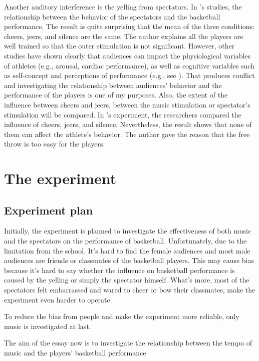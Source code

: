 \documentclass[man,floatsintext]{apa7}
\begin{document}
Another auditory interference is the yelling from spectators. In \textcite{eptingCheersVsJeers}'s studies, the relationship between the behavior of the spectators and the basketball performance. The result is quite surprising that the mean of the three conditions: cheers, jeers, and silence are the same. The author explains all the players are well trained so that the outer stimulation is not significant. However, other studies have shown clearly that audiences can impact the physiological variables of athletes (e.g., arousal, cardiac performance), as well as cognitive variables such as self-concept and perceptions of performance  (e.g., see \textcite{jonesAllWorldStage2007}). That produces conflict and investigating the relationship between audiences' behavior and the performance of the players is one of my purposes. Also, the extent of the influence between cheers and jeers, between the music stimulation or spectator's stimulation will be compared. In \textcite{eptingCheersVsJeers}'s experiment,  the researchers compared the influence of cheers, jeers, and silence. Nevertheless, the result shows that none of them can affect the athlete's behavior. The author gave the reason that the free throw is too easy for the players.

\section{The experiment}

\subsection{Experiment plan}
Initially, the experiment is planned to investigate the effectiveness of both music and the spectators on the performance of basketball. Unfortunately, due to the limitation from the school. It's hard to find the female audiences and most male audiences are friends or classmates of the basketball players. This may cause bias because it's hard to say whether the influence on basketball performance is caused by the yelling or simply the spectator himself. What's more, most of the spectators felt embarrassed and wared to cheer or bow their classmates, make the experiment even harder to operate.

To reduce the bias from people and make the experiment more reliable, only music is investigated at last. 

The aim of the essay now is to investigate the relationship between the tempo of music and the players' basketball performance
\end{document}
